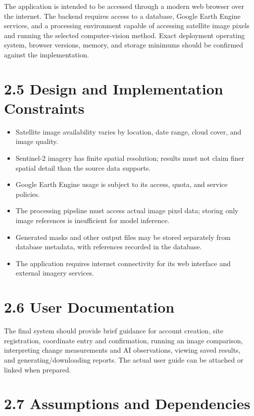\documentclass[12pt,a4paper]{report}
\begin{document}
The application is intended to be accessed through a modern web browser
over the internet. The backend requires access to a database, Google
Earth Engine services, and a processing environment capable of accessing
satellite image pixels and running the selected computer-vision method.
Exact deployment operating system, browser versions, memory, and storage
minimums should be confirmed against the implementation.

\section{2.5 Design and Implementation
Constraints}\label{design-and-implementation-constraints}

\begin{itemize}
\item
  Satellite image availability varies by location, date range, cloud
  cover, and image quality.
\item
  Sentinel-2 imagery has finite spatial resolution; results must not
  claim finer spatial detail than the source data supports.
\item
  Google Earth Engine usage is subject to its access, quota, and service
  policies.
\item
  The processing pipeline must access actual image pixel data; storing
  only image references is insufficient for model inference.
\item
  Generated masks and other output files may be stored separately from
  database metadata, with references recorded in the database.
\item
  The application requires internet connectivity for its web interface
  and external imagery services.
\end{itemize}

\section{2.6 User Documentation}\label{user-documentation}

The final system should provide brief guidance for account creation,
site registration, coordinate entry and confirmation, running an image
comparison, interpreting change measurements and AI observations,
viewing saved results, and generating/downloading reports. The actual
user guide can be attached or linked when prepared.

\section{2.7 Assumptions and
Dependencies}\label{assumptions-and-dependencies}
\end{document}
